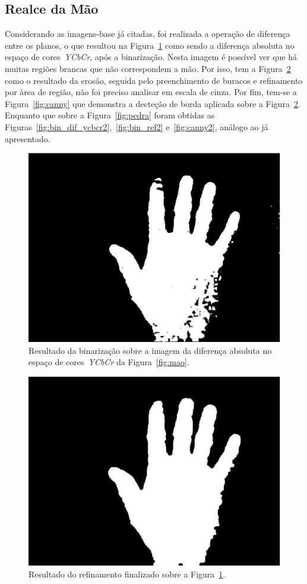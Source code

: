 \documentclass[conference]{Trabalho_Final}
\begin{document}
\subsection{Realce da M\~ao}
  \label{subsec:realce1}
Considerando as imagens-base j\'a citadas, foi realizada a opera\c{c}\~ao de diferen\c{c}a entre os planos, o que resultou na Figura~\ref{fig:bin_dif_ycbcr} como sendo a diferen\c{c}a absoluta no espa\c{c}o de cores~\textit{YCbCr}, ap\'os a binariza\c{c}\~ao. Nesta imagem \'e poss\'ivel ver que h\'a muitas regi\~oes brancas que n\~ao correspondem a m\~ao. Por isso, tem a Figura~\ref{fig:bin_ref} como o resultado da eros\~ao, seguida pelo preenchimento de buracos e refinamento por \`area de regi\~ao, n\~ao foi preciso analisar em escala de cinza. Por fim, tem-se a Figura~\ref{fig:canny} que demonstra a decte\c{c}\~ao de borda aplicada sobre a Figura~\ref{fig:bin_ref}. Enquanto que sobre a Figura~\ref{fig:pedra} foram obtidas as Figuras~\ref{fig:bin_dif_ycbcr2},~\ref{fig:bin_ref2} e~\ref{fig:canny2}, an\'alogo ao j\'a apresentado.

\begin{figure}[]
  \centering
  \includegraphics[width = 5 cm]{bin_dif_ycbcr}
  \caption{Resultado da binariza\c{c}\~ao sobre a imagem da diferen\c{c}a absoluta no espa\c{c}o de cores~\textit{YCbCr} da Figura~\ref{fig:mao}.}
  \label{fig:bin_dif_ycbcr}
\end{figure}

\begin{figure}[]
  \centering
  \includegraphics[width = 5 cm]{bin_ref}
  \caption{Resultado do refinamento finalizado sobre a Figura~\ref{fig:bin_dif_ycbcr}.}
  \label{fig:bin_ref}
\end{figure}
\end{document}
